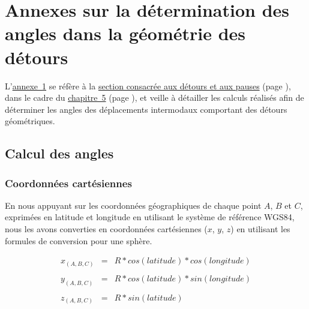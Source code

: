     \setcounter{section}{0}
\chapter{Annexes sur la détermination des angles dans la géométrie des détours}
    \label{annexes:calcul-detours}

L'\hyperref[annexes:calcul-detours]{annexe~\ref{annexes:calcul-detours}} se réfère à la \hyperref[chap5:detours-pauses-optimisation]{section consacrée aux détours et aux pauses} (page \pageref{chap5:detours-pauses-optimisation}), dans le cadre du \hyperref[chap5:titre]{chapitre~5} (page \pageref{chap5:titre}), et veille à détailler les calculs réalisés afin de déterminer les angles des déplacements intermodaux comportant des détours géométriques.%

    \setcounter{tocdepth}{2}
    \renewcommand{\localcontentsname}{Structure de l'annexe~\ref{annexes:calcul-detours}}
\localtableofcontents

    \newpage
    \newpage
\section{Calcul des angles}
    \label{annexes:calcul-detours-angles}

\subsection{Coordonnées cartésiennes}
    \label{annexes:calcul-detours-angles-cartesien}

En nous appuyant sur les coordonnées géographiques de chaque point \(A\), \(B\) et \(C\), exprimées en latitude et longitude en utilisant le système de référence \acrshort{WGS84}, nous les avons converties en coordonnées cartésiennes (\(x\), \(y\), \(z\)) en utilisant les formules de conversion pour une sphère.%

    \begin{equation*}
    \begin{array}{lclclclclcl}
    \displaystyle x_{(A, B, C)} &=& R* cos(latitude) * cos(longitude)\\\\
    \displaystyle y_{(A, B, C)} &=& R* cos(latitude) * sin(longitude)\\\\
    \displaystyle z_{(A, B, C)} &=& R* sin(latitude)\\\\
    \end{array}
    \end{equation*}

